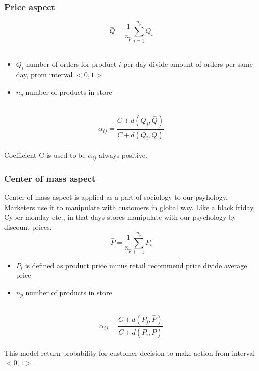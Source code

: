 \subsubsection{Price aspect} \label{subsubsec:model_psychology_price}
\begin{equation} \label{eq:26}
\overset{-}{Q} = \frac{1}{n_p} \sum_{i=1}^{n_p} Q_i
\end{equation}
\\
\begin{itemize}
    \item $Q_i$ number of orders for product $i$ per day divide amount of orders per same day, prom interval $<0,1>$
    \item $n_p$ number of products in store
\end{itemize}
\\
\begin{equation} \label{eq:27}
\alpha_{ij} = \frac{C+d(Q_j, \overset{-}{Q})}{C+d(Q_i, \overset{-}{Q})}
\end{equation}
\\
Coefficient C is used to be $\alpha_{ij}$ always positive.
\subsubsection{Center of mass aspect} \label{subsubsec:model_psychology_mass}
Center of mass aspect is applied as a part of sociology to our psyhology.
Marketers use it to manipulate with customers in global way.
Like a black friday, Cyber monday etc., in that days stores manipulate with our psychology by discount prices.
\\
\begin{equation} \label{eq:28}
\overset{-}{P} = \frac{1}{n_p} \sum_{i=1}^{n_p} P_i
\end{equation}
\begin{itemize}
    \item $P_i$ is defined as product price minus retail recommend price divide average price
    \item $n_p$ number of products in store
\end{itemize}
\\
\begin{equation} \label{eq:29}
\alpha_{ij} = \frac{C+d(P_j, \overset{-}{P})}{C+d(P_i, \overset{-}{P})}
\end{equation}
\\
This model return probability for customer decision to make action from interval $<0,1>$.
\\
